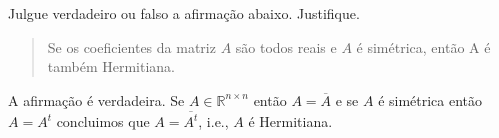 \begin{questions}

    \question Julgue verdadeiro ou falso a afirma\c{c}\~{a}o abaixo. Justifique.
    \begin{quote}
        Se os coeficientes da matriz $A$ s\~{a}o todos reais e $A$ \'{e} sim\'{e}trica, ent\~{a}o A \'{e} tamb\'{e}m Hermitiana.
    \end{quote}
    \begin{solution}
        A afirma\c{c}\~{a}o \'{e} verdadeira. Se $A \in \mathbb{R}^{n \times n}$ ent\~{a}o $A = \overline{A}$ e se $A$ \'{e} sim\'{e}trica ent\~{a}o $A = A^t$ concluimos que $A = \overline{A^t}$, i.e., $A$ \'{e} Hermitiana.
    \end{solution}


\end{questions}
